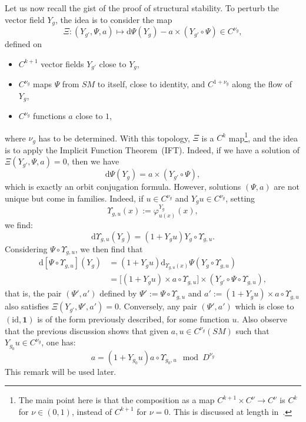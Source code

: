 \documentclass[10pt]{amsart}
\theoremstyle{definition}\newtheorem{defi}[theo]{Definition}\newtheorem{rema}[theo]{Remark}\newtheorem{exam}[theo]{Example}\newtheorem{exem}[theo]{Example}\newtheorem{nota}[theo]{Notation}
\newcommand{\bfun}{\mathbf{1}}
\newcommand{\dd}{\mathrm{d}}
\newcommand{\idl}{\mathrm{id}}
\begin{document}
Let us now recall the gist of the proof of structural stability. To perturb the vector field $Y_g$, the idea is to consider the map
\[
\Xi: \left(Y_{g'}, \Psi, a\right) \mapsto \dd \Psi(Y_g) - a \times \left(Y_{g'}\circ \Psi\right) \in C^{\nu_g},
\]
defined on
\begin{itemize}
\item $C^{k+1}$ vector fields $Y_{g'}$ close to $Y_g$,
\item $C^{\nu_g}$ maps $\Psi$ from $SM$ to itself, close to identity, and $C^{1+\nu_g}$ along the flow of $Y_g$,
\item $C^{\nu_g}$ functions $a$ close to $1$,
\end{itemize}
where $\nu_g$ has to be determined. With this topology, $\Xi$ is a $C^k$ map\footnote{The main point here is that the composition as a map $C^{k+1}\times C^\nu\to C^\nu$ is $C^k$ for $\nu\in (0,1)$, instead of $C^{k+1}$ for $\nu=0$. This is discussed at length in~\cite{DeLaLLave-Obaya-98}.}, and the idea is to apply the Implicit Function Theorem~(IFT). Indeed, if we have a solution of $\Xi(Y_{g'}, \Psi, a) = 0$, then we have
\begin{equation}\label{eq:conjugation}
\dd \Psi(Y_g) = a \times (Y_{g'} \circ \Psi),
\end{equation}
which is exactly an orbit conjugation formula. However, solutions $(\Psi,a)$ are not unique but come in families. Indeed, if $u\in C^{\nu_g}$ and $Y_g u \in C^{\nu_g}$, setting
\[
\Upsilon_{g,u}(x) := \varphi^{Y_g}_{u(x)}(x),
\]
we find:
\[
\dd \Upsilon_{g,u} (Y_g) = \left(1+ Y_g u\right) Y_g\circ \Upsilon_{g,u}.
\]
Considering $\Psi \circ \Upsilon_{g,u}$, we then find that
\begin{align*}
\dd \left[\Psi \circ \Upsilon_{g,u}\right](Y_g) & =\left(1+ Y_g u\right) \dd_{\Upsilon_{g,u}(x)} \Psi \left(Y_g \circ \Upsilon_{g,u}\right) \\
& = \Big[\left(1+ Y_g u\right) \times a \circ \Upsilon_{g,u}\Big] \times \left(Y_{g'} \circ \Psi\circ \Upsilon_{g,u}\right),
\end{align*}
that is, the pair $(\Psi',a')$ defined by $\Psi' := \Psi \circ \Upsilon_{g,u}$ and $a' := (1+ Y_g u) \times a \circ \Upsilon_{g,u}$ also satisfies $\Xi(Y_{g'},\Psi',a') = 0$. Conversely, any pair $(\Psi',a')$ which is close to $(\idl,\bfun)$ is of the form previously described, for some function $u$. Also observe that the previous discussion shows that given $a, u \in C^{\nu_g}(SM)$ such that $Y_{g_0} u\in C^{\nu_g}$, one has:
\begin{equation}\label{equation:structure}
a = \left(1+Y_{g_0}u\right) a \circ \Upsilon_{g_0,u} \mod D^{\nu_g}
\end{equation}
This remark will be used later.
\end{document}
